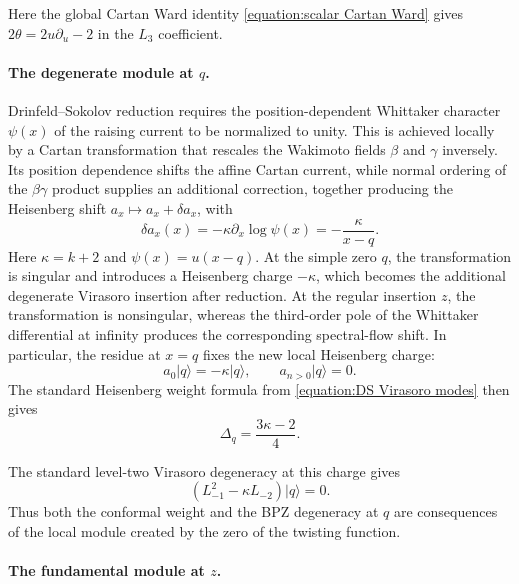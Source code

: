 \documentclass[a4paper,11pt]{article}
\numberwithin{equation}{section}
\begin{document}
Here the global Cartan Ward identity
\eqref{equation:scalar Cartan Ward} gives
$2\theta=2u\partial_{u}-2$ in the $L_{3}$ coefficient.

\paragraph*{The degenerate module at $q$.}

Drinfeld--Sokolov reduction requires the position-dependent Whittaker
character $\psi(x)$ of the raising current to be normalized to unity.
This is achieved locally by a Cartan transformation that rescales the
Wakimoto fields $\beta$ and $\gamma$ inversely.  Its position dependence
shifts the affine Cartan current, while normal ordering of the
$\beta\gamma$ product supplies an additional correction, together
producing the Heisenberg shift $a_x\mapsto a_x+\delta a_x$, with
\begin{equation}
	\delta a_{x}(x)
	=
 -\kappa\partial_{x}\log\psi(x)
 =-\frac{\kappa}{x-q}.
\end{equation}
Here $\kappa=k+2$ and $\psi(x)=u(x-q)$.  At the simple zero $q$,
the transformation is singular and introduces a Heisenberg charge
$-\kappa$, which becomes the additional degenerate Virasoro insertion
after reduction.  At the regular insertion $z$, the transformation is
nonsingular, whereas the third-order pole of the Whittaker differential
at infinity produces the corresponding spectral-flow shift.  In
particular, the residue at $x=q$ fixes the new local Heisenberg charge:
\begin{equation}
	a_{0}|q\rangle
	=
	-\kappa|q\rangle,
	\qquad
	a_{n>0}|q\rangle=0.
\end{equation}
The standard Heisenberg weight formula from
\eqref{equation:DS Virasoro modes} then gives
\begin{equation}
	\label{equation:q conformal weight from twist}
	\Delta_{q}
	=
	\frac{3\kappa-2}{4}.
\end{equation}

The standard level-two Virasoro degeneracy at this charge gives
\begin{equation}
	\label{equation:q null vector}
	\left(
	L_{-1}^{2}-\kappa L_{-2}
	\right)|q\rangle=0.
\end{equation}
Thus both the conformal weight and the BPZ degeneracy at $q$ are consequences
of the local module created by the zero of the twisting function.

\paragraph*{The fundamental module at $z$.}
\end{document}

